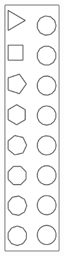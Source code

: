 \begin{minipage}{0.3\textwidth}
\begin{figure}[H]
   \includegraphics[width=2.5cm,trim=4 4 8 4,clip]{./images/ripetere/ripetere-7.png}
   \label{rip-7}
\end{figure}
\end{minipage} \hfill

\vskip 1cm

\pagebreak

